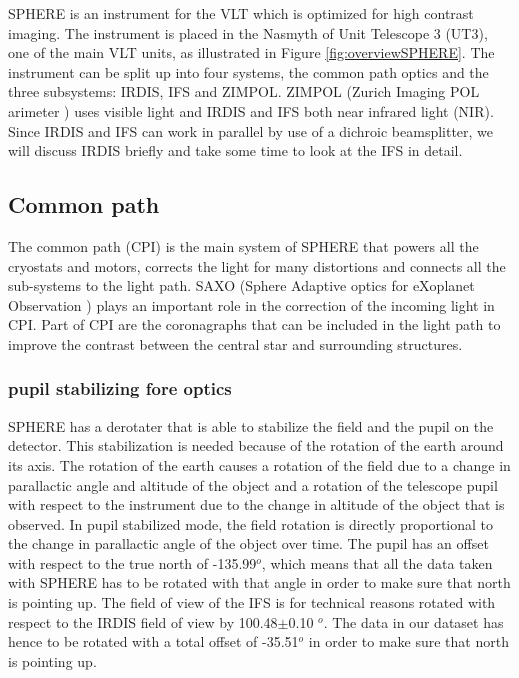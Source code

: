 \documentclass[twoside,single,12pt]{lion-msc}
\begin{document}
SPHERE is an instrument for the VLT which is optimized for high contrast imaging. The instrument is placed in the Nasmyth of Unit Telescope 3 (UT3), one of the main VLT units, as illustrated in Figure \ref{fig:overviewSPHERE}. The instrument can be split up into four systems, the common path optics and the three subsystems: IRDIS, IFS and ZIMPOL. ZIMPOL (Zurich Imaging POL arimeter \cite{Thalmann2008}) uses visible light and IRDIS and IFS both near infrared light (NIR). Since IRDIS and IFS can work in parallel by use of a dichroic beamsplitter, we will discuss IRDIS briefly and take some time to look at the IFS in detail.

\subsection{Common path}
The common path (CPI) is the main system of SPHERE that powers all the cryostats and motors, corrects the light for many distortions and connects all the sub-systems to the light path. SAXO (Sphere Adaptive optics for eXoplanet Observation \citep{Sauvage2010}) plays an important role in the correction of the incoming light in CPI. Part of CPI are the coronagraphs that can be included in the light path to improve the contrast between the central star and surrounding structures.

\subsubsection{pupil stabilizing fore optics}
SPHERE has a derotater that is able to stabilize the field and the pupil on the detector. This stabilization is needed because of the rotation of the earth around its axis. The rotation of the earth causes a rotation of the field due to a change in parallactic angle and altitude of the object and a rotation of the telescope pupil with respect to the instrument due to the change in altitude of the object that is observed. In pupil stabilized mode, the field rotation is directly proportional to the change in parallactic angle of the object over time. The pupil has an offset with respect to the true north of -135.99$^o$, which means that all the data taken with SPHERE has to be rotated with that angle in order to make sure that north is pointing up. The field of view of the IFS is for technical reasons rotated with respect to the IRDIS field of view by 100.48$\pm$0.10 $^o$. The data in our dataset has hence to be rotated with a total offset of -35.51$^o$ in order to make sure that north is pointing up\cite{Maire2016}.
\bigskip
\end{document}
